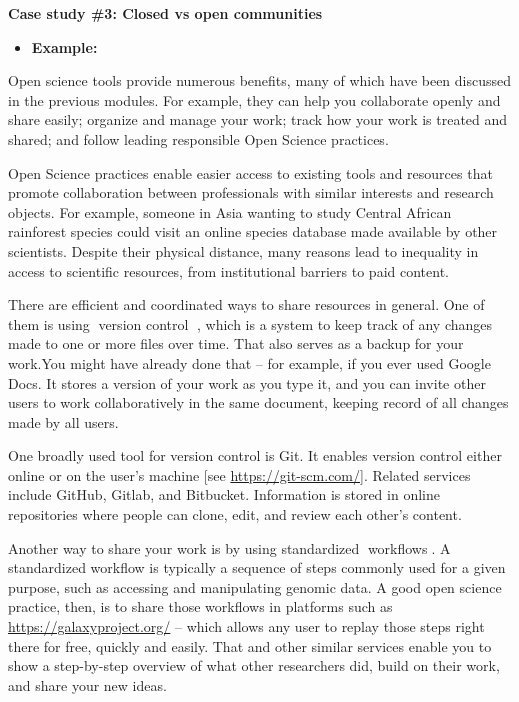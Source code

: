 \documentclass[
  letterpaper,
  DIV=11,
  numbers=noendperiod]{scrreport}
\providecommand{\tightlist}{%
  \setlength{\itemsep}{0pt}\setlength{\parskip}{0pt}}\usepackage{longtable,booktabs,array}
\begin{document}
\textbf{Case study \#3: Closed vs open communities}

\begin{itemize}
\tightlist
\item
  \textbf{Example:}
\end{itemize}

Open science tools provide numerous benefits, many of which have been
discussed in the previous modules. For example, they can help you
collaborate openly and share easily; organize and manage your work;
track how your work is treated and shared; and follow leading
responsible Open Science practices.

Open Science practices enable easier access to existing tools and
resources that promote collaboration between professionals with similar
interests and research objects. For example, someone in Asia wanting to
study Central African rainforest species could visit an online species
database made available by other scientists. Despite their physical
distance, many reasons lead to inequality in access to scientific
resources, from institutional barriers to paid content.

There are efficient and coordinated ways to share resources in general.
One of them is using {📖}version control {📖}, which is a system to keep
track of any changes made to one or more files over time. That also
serves as a backup for your work.You might have already done that -- for
example, if you ever used Google Docs. It stores a version of your work
as you type it, and you can invite other users to work collaboratively
in the same document, keeping record of all changes made by all users.

One broadly used tool for version control is Git. It enables version
control either online or on the user's machine {[}see
\url{https://git-scm.com/}{]}. Related services include GitHub, Gitlab,
and Bitbucket. Information is stored in online repositories where people
can clone, edit, and review each other's content.

Another way to share your work is by using standardized
{📖}workflows{📖}. A standardized workflow is typically a sequence of
steps commonly used for a given purpose, such as accessing and
manipulating genomic data. A good open science practice, then, is to
share those workflows in platforms such as
\url{https://galaxyproject.org/} -- which allows any user to replay
those steps right there for free, quickly and easily. That and other
similar services enable you to show a step-by-step overview of what
other researchers did, build on their work, and share your new ideas.
\end{document}
